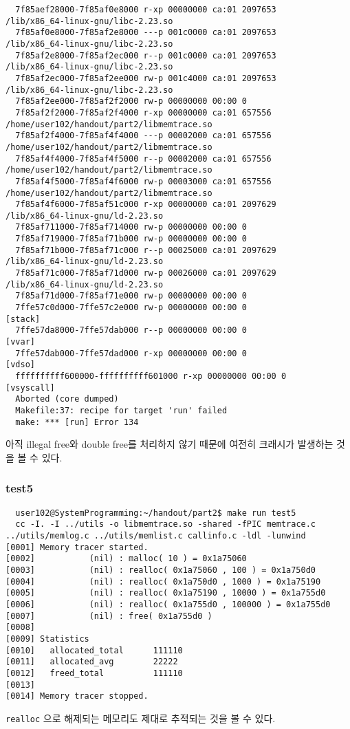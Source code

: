 \documentclass{report}
\begin{document}
\begin{verbatim}
  7f85aef28000-7f85af0e8000 r-xp 00000000 ca:01 2097653                    /lib/x86_64-linux-gnu/libc-2.23.so
  7f85af0e8000-7f85af2e8000 ---p 001c0000 ca:01 2097653                    /lib/x86_64-linux-gnu/libc-2.23.so
  7f85af2e8000-7f85af2ec000 r--p 001c0000 ca:01 2097653                    /lib/x86_64-linux-gnu/libc-2.23.so
  7f85af2ec000-7f85af2ee000 rw-p 001c4000 ca:01 2097653                    /lib/x86_64-linux-gnu/libc-2.23.so
  7f85af2ee000-7f85af2f2000 rw-p 00000000 00:00 0
  7f85af2f2000-7f85af2f4000 r-xp 00000000 ca:01 657556                     /home/user102/handout/part2/libmemtrace.so
  7f85af2f4000-7f85af4f4000 ---p 00002000 ca:01 657556                     /home/user102/handout/part2/libmemtrace.so
  7f85af4f4000-7f85af4f5000 r--p 00002000 ca:01 657556                     /home/user102/handout/part2/libmemtrace.so
  7f85af4f5000-7f85af4f6000 rw-p 00003000 ca:01 657556                     /home/user102/handout/part2/libmemtrace.so
  7f85af4f6000-7f85af51c000 r-xp 00000000 ca:01 2097629                    /lib/x86_64-linux-gnu/ld-2.23.so
  7f85af711000-7f85af714000 rw-p 00000000 00:00 0
  7f85af719000-7f85af71b000 rw-p 00000000 00:00 0
  7f85af71b000-7f85af71c000 r--p 00025000 ca:01 2097629                    /lib/x86_64-linux-gnu/ld-2.23.so
  7f85af71c000-7f85af71d000 rw-p 00026000 ca:01 2097629                    /lib/x86_64-linux-gnu/ld-2.23.so
  7f85af71d000-7f85af71e000 rw-p 00000000 00:00 0
  7ffe57c0d000-7ffe57c2e000 rw-p 00000000 00:00 0                          [stack]
  7ffe57da8000-7ffe57dab000 r--p 00000000 00:00 0                          [vvar]
  7ffe57dab000-7ffe57dad000 r-xp 00000000 00:00 0                          [vdso]
  ffffffffff600000-ffffffffff601000 r-xp 00000000 00:00 0                  [vsyscall]
  Aborted (core dumped)
  Makefile:37: recipe for target 'run' failed
  make: *** [run] Error 134
\end{verbatim}
아직 illegal free와 double free를 처리하지 않기 때문에 여전히 크래시가 발생하는 것을 볼 수 있다.
\subsubsection{test5}
\begin{verbatim}
  user102@SystemProgramming:~/handout/part2$ make run test5
  cc -I. -I ../utils -o libmemtrace.so -shared -fPIC memtrace.c ../utils/memlog.c ../utils/memlist.c callinfo.c -ldl -lunwind
[0001] Memory tracer started.
[0002]           (nil) : malloc( 10 ) = 0x1a75060
[0003]           (nil) : realloc( 0x1a75060 , 100 ) = 0x1a750d0
[0004]           (nil) : realloc( 0x1a750d0 , 1000 ) = 0x1a75190
[0005]           (nil) : realloc( 0x1a75190 , 10000 ) = 0x1a755d0
[0006]           (nil) : realloc( 0x1a755d0 , 100000 ) = 0x1a755d0
[0007]           (nil) : free( 0x1a755d0 )
[0008]
[0009] Statistics
[0010]   allocated_total      111110
[0011]   allocated_avg        22222
[0012]   freed_total          111110
[0013]
[0014] Memory tracer stopped.
\end{verbatim}  
\lstinline{realloc} 으로 해제되는 메모리도 제대로 추적되는 것을 볼 수 있다.
\end{document}
